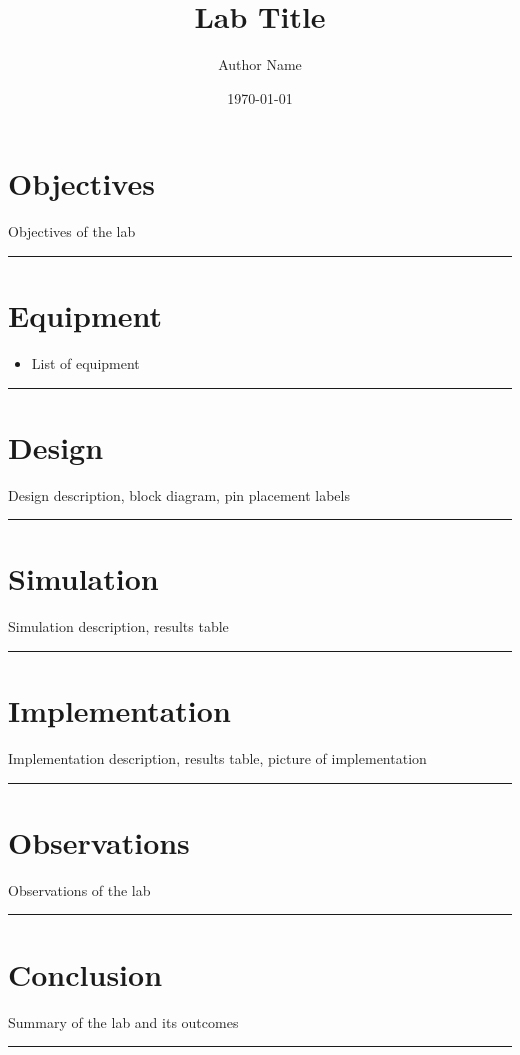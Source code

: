 \documentclass{article}
\title{\textbf{{\huge Lab Title}}}
\author{Author Name}
\date{\today}
\begin{document}
\pagestyle{fancy}
\fancyhf{}
\rhead{\thepage}
\maketitle
\section*{\textcolor{mycolor}{Objectives}}
Objectives of the lab
\vspace{5mm}
\hrule

\section*{\textcolor{mycolor}{Equipment}}
\begin{itemize}
  \item List of equipment
\end{itemize}
\vspace{5mm}
\hrule

\section*{\textcolor{mycolor}{Design}}
Design description, block diagram, pin placement labels
\vspace{5mm}
\hrule

\section*{\textcolor{mycolor}{Simulation}}
Simulation description, results table
\vspace{5mm}
\hrule

\section*{\textcolor{mycolor}{Implementation}}
Implementation description, results table, picture of implementation
\vspace{5mm}
\hrule

\section*{\textcolor{mycolor}{Observations}}
Observations of the lab
\vspace{5mm}
\hrule

\section*{\textcolor{mycolor}{Conclusion}}
Summary of the lab and its outcomes
\vspace{5mm}
\hrule
\end{document}
